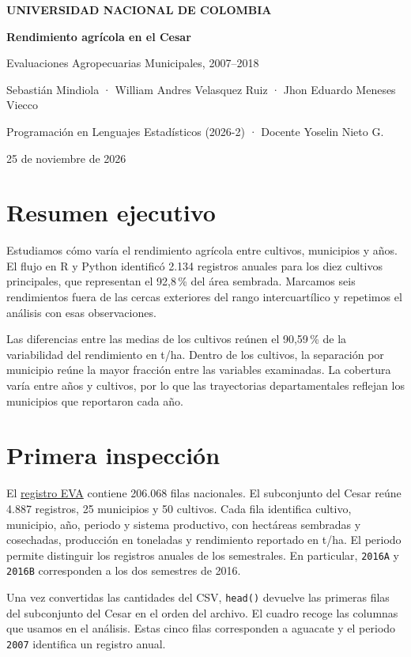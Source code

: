 \documentclass[11pt,a4paper]{article}
\newcommand{\autores}{Sebastián Mindiola · William Andres Velasquez Ruiz · Jhon Eduardo Meneses Viecco}
\begin{document}
\color{tinta}
{\color{eva}\small\textbf{UNIVERSIDAD NACIONAL DE COLOMBIA}\par}
\vspace{.25cm}
{\huge\bfseries Rendimiento agrícola en el Cesar\par}
{\large Evaluaciones Agropecuarias Municipales, 2007--2018\par}
\vspace{.3cm}
{\small \autores\par
Programación en Lenguajes Estadísticos (2026-2) · Docente Yoselin Nieto G.\par
25 de noviembre de 2026\par}

\section*{Resumen ejecutivo}
Estudiamos cómo varía el rendimiento agrícola entre cultivos, municipios y años.
El flujo en R y Python identificó 2.134 registros anuales para los diez cultivos principales,
que representan el 92,8\,\% del área sembrada. Marcamos seis rendimientos fuera de las cercas
exteriores del rango intercuartílico y repetimos el análisis con esas observaciones.

Las diferencias entre las medias de los cultivos reúnen el 90,59\,\% de la variabilidad
del rendimiento en t/ha. Dentro de los cultivos, la separación por municipio reúne
la mayor fracción entre las variables examinadas. La cobertura varía entre años y cultivos,
por lo que las trayectorias departamentales reflejan los municipios que reportaron cada año.

\section{Primera inspección}
El \href{https://www.datos.gov.co/d/2pnw-mmge}{registro EVA}
contiene 206.068 filas nacionales. El subconjunto del Cesar reúne 4.887 registros,
25 municipios y 50 cultivos. Cada fila identifica cultivo, municipio, año,
periodo y sistema productivo, con hectáreas sembradas y cosechadas, producción en toneladas y
rendimiento reportado en t/ha. El periodo permite distinguir los registros anuales de los
semestrales. En particular, \texttt{2016A} y \texttt{2016B} corresponden a los dos semestres de 2016.

Una vez convertidas las cantidades del CSV, \texttt{head()} devuelve las primeras filas del
subconjunto del Cesar en el orden del archivo. El cuadro recoge las columnas que usamos
en el análisis. Estas cinco filas corresponden a aguacate y el periodo \texttt{2007}
identifica un registro anual.
\end{document}
